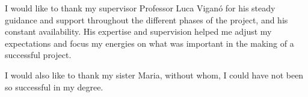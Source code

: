 I would like to thank my supervisor Professor Luca Viganó for his steady guidance and support throughout the different phases of the project, and his constant availability.
His expertise and supervision helped me adjust my expectations and focus my energies on what was important in the making of a successful project.\newline

I would also like to thank my sister Maria, without whom, I could have not been so successful in my degree.